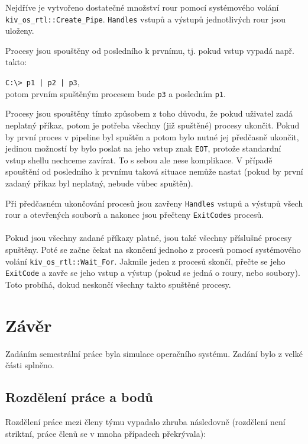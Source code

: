 \documentclass[12pt, a4paper]{article}
\let\oldsection\section
\renewcommand\section{\clearpage\oldsection}
\begin{document}
	Nejdříve je vytvořeno dostatečné množství rour pomocí systémového volání \texttt{kiv\_os\_rtl::Create\_Pipe}. \texttt{Handles} vstupů a výstupů jednotlivých rour jsou uloženy.	
	
	Procesy jsou spouštěny od posledního k prvnímu, tj. pokud vstup vypadá např. takto:
	
	\texttt{C:\textbackslash> p1 | p2 | p3},\\
	potom prvním spuštěným procesem bude \texttt{p3} a posledním \texttt{p1}.
	
	Procesy jsou spouštěny tímto způsobem z toho důvodu, že pokud uživatel zadá neplatný příkaz, potom je potřeba všechny (již spuštěné) procesy ukončit. Pokud by první proces v pipeline byl spuštěn a potom bylo nutné jej předčasně ukončit, jedinou možností by bylo poslat na jeho vstup znak \texttt{EOT}, protože standardní vstup shellu nechceme zavírat. To s sebou ale nese komplikace. V případě spouštění od posledního k prvnímu taková situace nemůže nastat (pokud by první zadaný příkaz byl neplatný, nebude vůbec spuštěn).
	
	Při předčasném ukončování procesů jsou zavřeny \texttt{Handles} vstupů a výstupů všech rour a otevřených souborů a nakonec jsou přečteny \texttt{ExitCodes} procesů.
	\\
	\\
	Pokud jsou všechny zadané příkazy platné, jsou také všechny příslušné procesy spuštěny. Poté se začne čekat na skončení jednoho z procesů pomocí systémového volání \texttt{kiv\_os\_rtl::Wait\_For}. Jakmile jeden z procesů skončí, přečte se jeho \texttt{ExitCode} a zavře se jeho vstup a výstup (pokud se jedná o roury, nebo soubory). Toto probíhá, dokud neskončí všechny takto spuštěné procesy.





\section{Závěr}	

Zadáním semestrální práce byla simulace operačního systému. Zadání bylo z velké části splněno.

\subsection{Rozdělení práce a bodů}

Rozdělení práce mezi členy týmu vypadalo zhruba následovně (rozdělení není striktní, práce členů se v mnoha případech překrývala):
\end{document}
